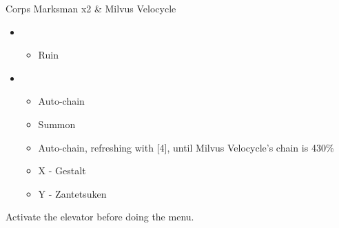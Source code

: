  

\begin{battle}{Corps Marksman x2 \& Milvus Velocycle}
\begin{itemize}
    \item \first
    \begin{itemize}
        \item Ruin
    \end{itemize}
    \item \fifth
    \begin{itemize}
        \item Auto-chain
        \item Summon
        \item Auto-chain, refreshing with [4], until Milvus Velocycle's chain is 430\%
        \item X - Gestalt
        \item Y - Zantetsuken
    \end{itemize}
\end{itemize}
\end{battle}
Activate the elevator before doing the menu.
